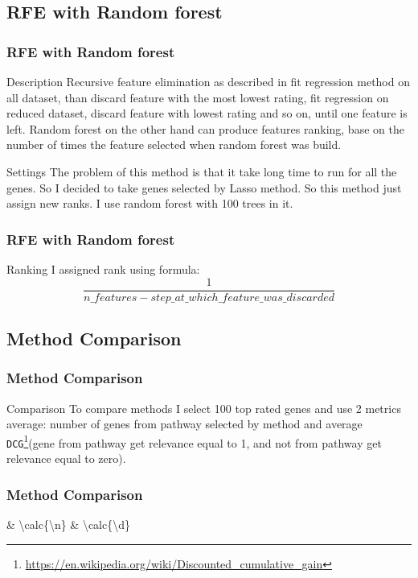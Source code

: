 \documentclass{beamer}
\newcommand*{\formatNumber}[2][]{\num[%
  round-mode=places,%
  round-precision=3,%
  output-decimal-marker={,},%
  #1%
  ]{\calc{#2}}}
\begin{document}
\subsection{RFE with Random forest}
\begin{frame}
\frametitle{RFE with Random forest}
\begin{block}{Description}
Recursive feature elimination as described in \cite{rfe} fit regression method on all dataset, than discard feature with the most lowest rating, fit regression on reduced dataset, discard feature with lowest rating and so on, until one feature is left. Random forest on the other hand can produce features ranking, base on the number of times the feature selected when random forest was build.
\end{block}
\begin{block}{Settings}
The problem of this method is that it take long time to run for all the genes. So I decided to take genes selected by Lasso method. So this method just assign new ranks. I use random forest with 100 trees in it. 
\end{block}
\end{frame}
\begin{frame}
\frametitle{RFE with Random forest}
\begin{block}{Ranking}
I assigned rank using formula:
\begin{equation*}
\frac{1}{n\_features - step\_at\_which\_feature\_was\_discarded}
\end{equation*}
\end{block}
\end{frame}


\subsection{Method Comparison}
\begin{frame}
\frametitle{Method Comparison}
\begin{block}{Comparison}
To compare methods I select 100 top rated genes and use 2 metrics average: number of genes from pathway selected by method and average \texttt{DCG}\footnote{\url{https://en.wikipedia.org/wiki/Discounted_cumulative_gain}}(gene from pathway get relevance equal to 1, and not from pathway get relevance equal to zero).
\end{block}
\end{frame}

\begin{frame}
\frametitle{Method Comparison}
\begin{table}
\centering
\caption{Features selection method comparison.}
\label{table:method_comparison}
%
{\m & \formatNumber{\n} & \formatNumber{\d}}%
\end{table}
\end{frame}
\end{document}
